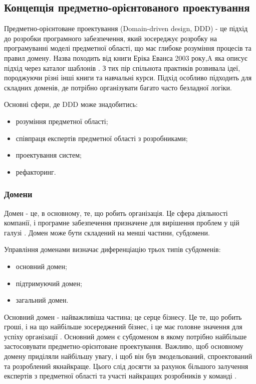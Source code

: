 \subsection{Концепція предметно-орієнтованого проектування}

Предметно-орієнтоване проектування (Domain-driven design, DDD) 
- це підхід до розробки програмного забезпечення, 
який зосереджує розробку на програмуванні моделі предметної області,
що має глибоке розуміння процесів та правил домену.
Назва походить від книги Еріка Еванса 2003 року,A
яка описує підхід через каталог шаблонів \cite{ddd-evans}.
З тих пір спільнота практиків розвивала ідеї,
породжуючи різні інші книги та навчальні курси.
Підхід особливо підходить для складних доменів,
де потрібно організувати багато часто безладної логіки.

Основні сфери, де DDD може знадобитись:
\begin{itemize}
    \item розуміння предметної області;
    \item співпраця експертів предметної області з розробниками;
    \item проектування систем;
    \item рефакторинг.
\end{itemize}

\subsubsection{Домени}
Домен - це, в основному, те, що робить організація.
Це сфера діяльності компанії, і програмне забезпечення призначене для
вирішення проблем у цій галузі \cite{ddd-vernon}. Домен може бути складений на менші частини,
субдомени. 

Управління доменами визначає диференціацію трьох типів субдоменів:
\begin{itemize}
    \item основний домен;
    \item підтримуючий домен;
    \item загальний домен.
\end{itemize}

Основний домен - найважливіша частина; це серце бізнесу.
Це те, що робить гроші, і на що найбільше зосереджений бізнес,
і це має головне значення для успіху організації \cite{ddd-vernon}.
Основний домен є субдоменом в якому потрібно найбільше застосовувати
предметно-орієнтоване проектування.
Важливо, щоб основному домену приділяли найбільшу увагу,
і щоб він був змодельований, спроектований та розроблений якнайкраще.
Цього слід досягти за рахунок більшого залучення експертів з предметної області
та участі найкращих розробників у команді \cite{ddd-millett}.

